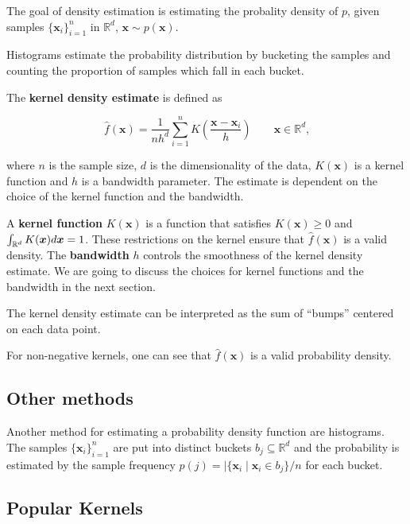 \documentclass{article}
\begin{document}
The goal of density estimation is estimating the probality density of $p$, given samples $\{\bm{x}_i\}_{i=1}^n$ in $\mathbb{R}^d$, $\bm{x} \sim p(\bm{x})$.


Histograms estimate the probability distribution by bucketing the samples and counting the proportion of samples which fall in each bucket.

The \textbf{kernel density estimate} is defined as

\begin{equation}
	\hat{f}(\bm{x}) = \frac{1}{nh^d} \sum_{i=1}^n K\left(\frac{\bm{x} - \bm{x}_i}{h} \right) \qquad \bm{x} \in \mathbb{R}^d\text{,}
	\label{eq:kernel-density-estimate}
\end{equation}

where $n$ is the sample size, $d$ is the dimensionality of the data, $K(\bm{x})$ is a kernel function and $h$ is a bandwidth parameter. The estimate is dependent on the choice of the kernel function and the bandwidth.

A \textbf{kernel function} $K(\bm{x})$ is a function that satisfies $K(\bm{x}) \geq 0$ and $\int_{\mathbb{R}^d} K(\bm{x}) d\bm{x} =\nobreak 1$. These restrictions on the kernel ensure that $\hat{f}(\bm{x})$ is a valid density. The \textbf{bandwidth} $h$ controls the smoothness of the kernel density estimate. We are going to discuss the choices for kernel functions and the bandwidth in the next section.

The kernel density estimate can be interpreted as the sum of ``bumps'' centered on each data point.

For non-negative kernels, one can see that $\hat{f}(\bm{x})$ is a valid probability density.


\subsection{Other methods}

Another method for estimating a probability density function are histograms. The samples $\{ \bm{x}_i \}_{i=1}^n$ are put into distinct buckets $b_j \subseteq \mathbb{R}^d$ and the probability is estimated by the sample frequency $p(j) = \lvert \{\bm{x}_i \mid \bm{x}_i \in b_j\} / n$ for each bucket.


\subsection{Popular Kernels}

\end{document}
